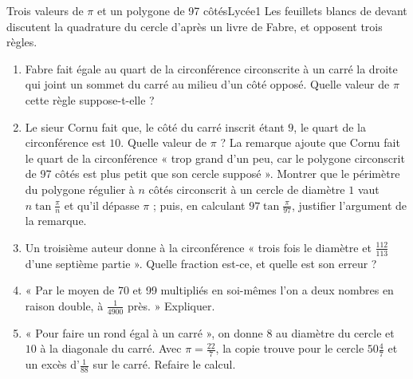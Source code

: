 \documentclass[11pt,a4paper]{article}
\begin{document}
\begin{exercice}{Trois valeurs de $\pi$ et un polygone de 97 côtés}{Lycée}{1}
Les feuillets blancs de devant discutent la quadrature du cercle d'après un livre
de Fabre, et opposent trois règles.


\begin{enumerate}
\item Fabre fait égale au quart de la circonférence circonscrite à un carré la
  droite qui joint un sommet du carré au milieu d'un côté opposé. Quelle valeur
  de $\pi$ cette règle suppose-t-elle ?
\item Le sieur Cornu fait que, le côté du carré inscrit étant $9$, le quart de la
  circonférence est $10$. Quelle valeur de $\pi$ ? La remarque ajoute que Cornu
  fait le quart de la circonférence « trop grand d'un peu, car le polygone
  circonscrit de 97 côtés est plus petit que son cercle supposé ». Montrer que le
  périmètre du polygone régulier à $n$ côtés circonscrit à un cercle de diamètre
  $1$ vaut $n\tan\frac{\pi}{n}$ et qu'il dépasse $\pi$ ; puis, en calculant
  $97\tan\frac{\pi}{97}$, justifier l'argument de la remarque.
\item Un troisième auteur donne à la circonférence « trois fois le diamètre et
  $\frac{112}{113}$ d'une septième partie ». Quelle fraction est-ce, et quelle
  est son erreur ?
\item « Par le moyen de 70 et 99 multipliés en soi-mêmes l'on a deux nombres en
  raison double, à $\frac{1}{4900}$ près. » Expliquer.
\item « Pour faire un rond égal à un carré », on donne $8$ au diamètre du cercle et
  $10$ à la diagonale du carré. Avec $\pi = \frac{22}{7}$, la copie trouve pour le
  cercle $50\frac47$ et un excès d'$\frac{1}{88}$ sur le carré. Refaire le calcul.
\end{enumerate}
\end{exercice}
\end{document}

